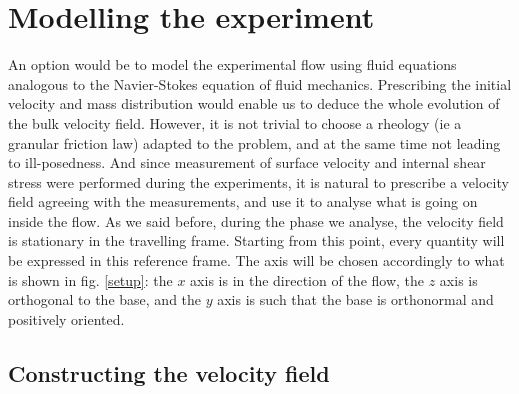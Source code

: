 \section{Modelling the experiment}

An option would be to model the experimental flow using fluid equations analogous to the Navier-Stokes equation of fluid mechanics. Prescribing the initial velocity and mass distribution would enable us to deduce the whole evolution of the bulk velocity field.
However, it is not trivial to choose a rheology (ie a granular friction law) adapted to the problem, and at the same time not leading to ill-posedness.
And since measurement of surface velocity and internal shear stress were performed during the experiments, it is natural to prescribe a velocity field agreeing with the measurements, and use it to analyse what is going on inside the flow.
As we said before, during the phase we analyse, the velocity field is stationary in the travelling frame. Starting from this point, every quantity will be expressed in this reference frame. The axis will be chosen accordingly to what is shown in fig. \ref{setup}: the $x$ axis is in the direction of the flow, the $z$ axis is orthogonal to the base, and the $y$ axis is such that the base is orthonormal and positively oriented.

\subsection{Constructing the velocity field}

